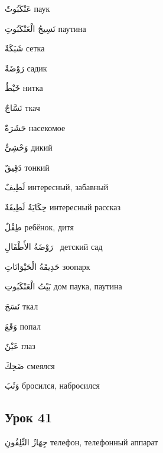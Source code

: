 \documentclass[a5paper]{article}
\newcommand\textstyleDropCaps[1]{#1}
\newcommand\textstyleCaptioncharacters[1]{#1}
\begin{document}
\textstyleCaptioncharacters{عَنْكَبُوتٌ }\textstyleDropCaps{паук‎}

\textstyleCaptioncharacters{نَسِيجُ الْعَنْكَبُوتِ }\textstyleDropCaps{пау­тина‎}

\textstyleCaptioncharacters{شَبَكَةٌ }\textstyleDropCaps{сетка‎}

\textstyleCaptioncharacters{رَوْضَةٌ }\textstyleDropCaps{садик‎}

\textstyleCaptioncharacters{خَيْطٌ }\textstyleDropCaps{нитка‎}

\textstyleCaptioncharacters{نَسَّاجٌ }\textstyleDropCaps{ткач‎}

\textstyleCaptioncharacters{حَشَرَةٌ }\textstyleDropCaps{насекомое‎}

\textstyleCaptioncharacters{وَحْشِىٌّ }\textstyleDropCaps{дикий‎}

\textstyleCaptioncharacters{دَقِيقٌ }\textstyleDropCaps{тонкий‎}

\textstyleCaptioncharacters{لَطِيفٌ }\textstyleDropCaps{интересный, забав­ный‎}

\textstyleCaptioncharacters{حِكَايَةٌ لَطِيفَةٌ }\textstyleDropCaps{интерес­ный рассказ‎}

\textstyleCaptioncharacters{طِفْلٌ }\textstyleDropCaps{ребёнок, дитя‎}

\textstyleCaptioncharacters{رَوْضَةُ الأَطْفَالِ \ }\textstyleDropCaps{дет­ский сад‎}

\textstyleCaptioncharacters{حَدِيقَةُ الْحَيْوَانَاتِ }\textstyleDropCaps{зоо­парк‎}

\textstyleCaptioncharacters{بَيْتُ الْعَنْكَبُوتِ }\textstyleDropCaps{дом пау­ка, паутина‎}

\textstyleCaptioncharacters{نَسَجَ }\textstyleDropCaps{ткал‎}

\textstyleCaptioncharacters{وَقَعَ }\textstyleDropCaps{попал‎}

\textstyleCaptioncharacters{عَيْنٌ }\textstyleDropCaps{глаз‎}

\textstyleCaptioncharacters{ضَحِكَ }\textstyleDropCaps{смеялся‎}

\textstyleCaptioncharacters{وَثَبَ }\textstyleDropCaps{бросился, набросил­ся‎}

\subsection[Урок 41‎]{\textstyleDropCaps{Урок 41‎}}
\textstyleCaptioncharacters{جِهَازُ التِّلِفُونِ }\textstyleDropCaps{телефон, телефонный аппарат‎}
\end{document}
